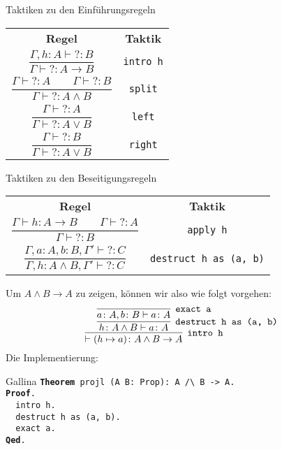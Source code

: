 \documentclass[8pt]{beamer}
\newcommand{\strong}[1]{\textsf{\textbf{#1}}}
\newcommand{\cond}{\rightarrow}
\newcommand{\kw}[1]{\textbf{#1}}
\newcommand{\unres}{{?}}
\begin{document}
\begin{frame}
\begin{block}{Taktiken zu den Einführungsregeln}
\begin{center}
\begin{tabular}{c@{\qquad\quad}c}
\strong{Regel} & \strong{Taktik}\\[6pt]
$\dfrac{\Gamma, h\colon A\vdash\unres\colon B}{\Gamma\vdash\unres\colon A\to B}$
& \texttt{intro h}\\[14pt]
$\dfrac{\Gamma\vdash\unres\colon A\qquad\Gamma\vdash\unres\colon B}
  {\Gamma\vdash\unres\colon A\land B}$
& \texttt{split}\\[14pt]
$\dfrac{\Gamma\vdash\unres\colon A}{\Gamma\vdash\unres\colon A\lor B}$
& \texttt{left}\\[14pt]
$\dfrac{\Gamma\vdash\unres\colon B}{\Gamma\vdash\unres\colon A\lor B}$
& \texttt{right}
\end{tabular}
\end{center}
\end{block}
\end{frame}

\begin{frame}
\begin{block}{Taktiken zu den Beseitigungsregeln}
\begin{center}
\begin{tabular}{c@{\qquad\quad}c}
\strong{Regel} & \strong{Taktik}\\[6pt]
$\dfrac{\Gamma\vdash h\colon A\to B\qquad\Gamma\vdash\unres\colon A}{\Gamma\vdash\unres\colon B}$
& \texttt{apply h}\\[14pt]
$\dfrac{\Gamma,a\colon A,b\colon B,\Gamma'\vdash\unres\colon C}
  {\Gamma,h\colon A\land B,\Gamma'\vdash\unres\colon C}$
& \texttt{destruct h as (a, b)}
\end{tabular}
\end{center}
\end{block}
\end{frame}

\begin{frame}
Um $A\land B\cond A$ zu zeigen, können wir also wie folgt vorgehen:
\[\infer[\texttt{intro h}]{\vdash (h\mapsto a)\colon A\land B\cond A}{
  \infer[\texttt{destruct h as (a, b)}]{h\colon A\land B\vdash a\colon A}{
    \infer[\texttt{exact a}]{a\colon A, b\colon B\vdash a\colon A}{}
  }
}\]\pause
Die Implementierung:
\begin{block}{Gallina}
\texttt{\kw{Theorem} projl (A B: Prop): A /{\textbackslash} B -> A.\\
\kw{Proof}.\\
\ \ intro h.\\
\ \ destruct h as (a, b).\\
\ \ exact a.\\
\kw{Qed}.}
\end{block}
\end{frame}
\end{document}
